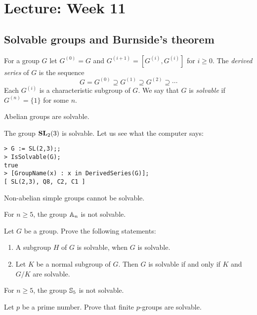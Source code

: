 \section{Lecture: Week 11}

\subsection{Solvable groups and Burnside's theorem}

For a group $G$ let 
$G^{(0)}=G$ and 
$G^{(i+1)}=[G^{(i)},G^{(i)}]$ for $i\geq0$.
The \emph{derived series} of $G$ is the sequence
\[
G=G^{(0)}\supseteq G^{(1)}\supseteq G^{(2)}\supseteq\cdots
\]
Each $G^{(i)}$ is a characteristic subgroup of $G$. We say that 
$G$ is \emph{solvable} if $G^{(n)}=\{1\}$ for some $n$.  

\begin{example}
	Abelian groups are solvable. 
\end{example}

\begin{example}
	The group $\mathbf{SL}_2(3)$ is solvable. 
	Let us see what the computer says:
\begin{lstlisting}
> G := SL(2,3);;
> IsSolvable(G);
true
> [GroupName(x) : x in DerivedSeries(G)];
[ SL(2,3), Q8, C2, C1 ]
\end{lstlisting}
\end{example}

\begin{example}
	Non-abelian simple groups cannot be solvable. 
\end{example}

For $n\geq5$, the group $\mathbb{A}_n$ is not solvable.

\begin{exercise}
	\label{xca:solvable}
	Let $G$ be a group. Prove the following statements:
	\begin{enumerate}
		\item A subgroup $H$ of $G$ is solvable, when $G$ is solvable.
		\item Let $K$ be a normal subgroup of $G$. 
		    Then $G$ is solvable if and only if $K$ and $G/K$ are solvable.
	\end{enumerate}
\end{exercise}

For $n\geq5$, the group $\mathbb{S}_5$ is not solvable. 

\begin{exercise}
\label{xca:pgroups_solvable}
	Let $p$ be a prime number. Prove that 
	finite $p$-groups are solvable.
\end{exercise}

